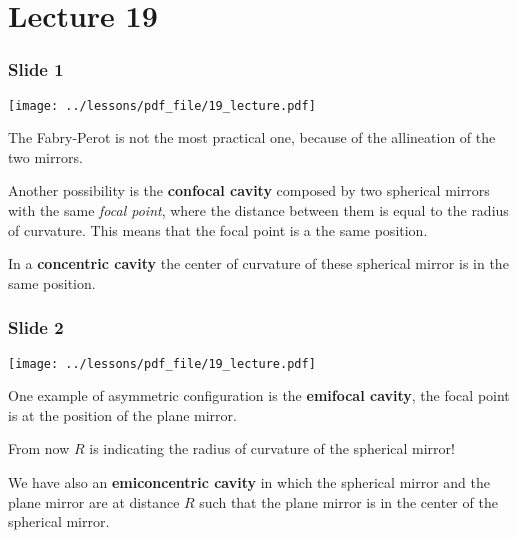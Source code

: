\documentclass[../main/main.tex]{subfiles}
\begin{document}
\pagestyle{plain}

\section{Lecture 19}


\subsubsection*{Slide 1}

\begin{minipage}[]{0.5\linewidth}
\centering
\texttt{[image: ../lessons/pdf\_file/19\_lecture.pdf]}
\end{minipage}
\hspace{0.3cm}\vspace{0.3cm}
\begin{minipage}[c]{0.47\linewidth}

The Fabry-Perot is not the most practical one, because of the allineation of the two mirrors.

Another possibility is the \textbf{confocal cavity} composed by two spherical mirrors with the same \emph{focal point}, where the distance between them is equal to the radius of curvature. This means that the focal point is a the same position.

In a \textbf{concentric cavity} the center of curvature of these spherical mirror is in the same position.

\end{minipage}

\subsubsection*{Slide 2}

\begin{minipage}[]{0.5\linewidth}
\centering
\texttt{[image: ../lessons/pdf\_file/19\_lecture.pdf]}
\end{minipage}
\hspace{0.3cm}\vspace{0.3cm}
\begin{minipage}[c]{0.47\linewidth}

One example of asymmetric configuration is the \textbf{emifocal cavity}, the focal point is at the position of the plane mirror.

From now \( R \) is indicating the radius of curvature of the spherical mirror!

We have also an \textbf{emiconcentric cavity} in which the spherical mirror and the plane mirror are at distance \( R \) such that the plane mirror is in the center of the spherical mirror.

\end{minipage}
\end{document}
